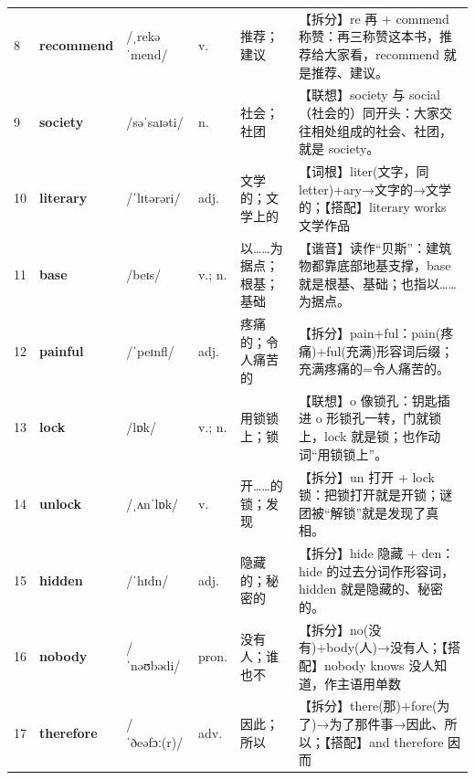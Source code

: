 \documentclass[UTF8,a4paper,11pt,oneside]{ctexbook}
\newcommand{\cellword}[1]{{\bfseries\textcolor{wordcol}{#1}}}
\newcommand{\cellipa}[1]{{\footnotesize\textcolor{ipacol}{#1}}}
\newcommand{\cellpos}[1]{\textcolor{poscol}{#1}}
\newcommand{\cellno}[1]{\textcolor{volcolor!75!black}{#1}}
\begin{document}
{\begin{longtable}{@{}C{0.045\textwidth}L{0.155\textwidth}L{0.175\textwidth}C{0.070\textwidth}L{0.180\textwidth}L{0.282\textwidth}@{}}
\cellno{8} & \cellword{recommend} & \cellipa{/ˌrekəˈmend/} & \cellpos{v.} & 推荐；建议 & \textcolor{tagSplit}{【拆分】}re 再 + commend 称赞：再三称赞这本书，推荐给大家看，recommend 就是推荐、建议。 \\
 \cellno{9} & \cellword{society} & \cellipa{/səˈsaɪəti/} & \cellpos{n.} & 社会；社团 & \textcolor{tagAssoc}{【联想】}society 与 social（社会的）同开头：大家交往相处组成的社会、社团，就是 society。 \\
\cellno{10} & \cellword{literary} & \cellipa{/ˈlɪtərəri/} & \cellpos{adj.} & 文学的；文学上的 & \textcolor{tagRoot}{【词根】}liter(文字，同 letter)+ary→\allowbreak{}文字的→\allowbreak{}文学的；\textcolor{tagColloc}{【搭配】}literary works 文学作品 \\
 \cellno{11} & \cellword{base} & \cellipa{/beɪs/} & \cellpos{v.;\allowbreak{} n.} & 以……为据点；根基；基础 & \textcolor{tagSound}{【谐音】}读作“贝斯”：建筑物都靠底部地基支撑，base 就是根基、基础；也指以……为据点。 \\
\cellno{12} & \cellword{painful} & \cellipa{/ˈpeɪnfl/} & \cellpos{adj.} & 疼痛的；令人痛苦的 & \textcolor{tagSplit}{【拆分】}pain+ful：pain(疼痛)+ful(充满)形容词后缀；充满疼痛的=令人痛苦的。 \\
 \cellno{13} & \cellword{lock} & \cellipa{/lɒk/} & \cellpos{v.;\allowbreak{} n.} & 用锁锁上；锁 & \textcolor{tagAssoc}{【联想】}o 像锁孔：钥匙插进 o 形锁孔一转，门就锁上，lock 就是锁；也作动词“用锁锁上”。 \\
\cellno{14} & \cellword{unlock} & \cellipa{/ˌʌnˈlɒk/} & \cellpos{v.} & 开……的锁；发现 & \textcolor{tagSplit}{【拆分】}un 打开 + lock 锁：把锁打开就是开锁；谜团被“解锁”就是发现了真相。 \\
 \cellno{15} & \cellword{hidden} & \cellipa{/ˈhɪdn/} & \cellpos{adj.} & 隐藏的；秘密的 & \textcolor{tagSplit}{【拆分】}hide 隐藏 + den：hide 的过去分词作形容词，hidden 就是隐藏的、秘密的。 \\
\cellno{16} & \cellword{nobody} & \cellipa{/ˈnəʊbədi/} & \cellpos{pron.} & 没有人；谁也不 & \textcolor{tagSplit}{【拆分】}no(没有)+body(人)→\allowbreak{}没有人；\textcolor{tagColloc}{【搭配】}nobody knows 没人知道，作主语用单数 \\
 \cellno{17} & \cellword{therefore} & \cellipa{/ˈðeəfɔː(r)/} & \cellpos{adv.} & 因此；所以 & \textcolor{tagSplit}{【拆分】}there(那)+fore(为了)→\allowbreak{}为了那件事→\allowbreak{}因此、所以；\textcolor{tagColloc}{【搭配】}and therefore 因而 \\

\end{longtable}}
\end{document}
